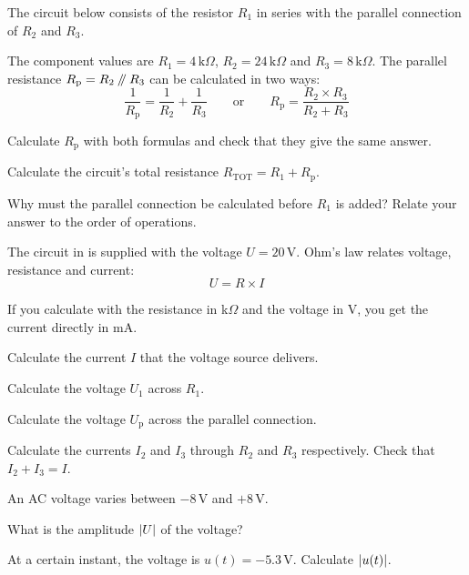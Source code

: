 The circuit below consists of the resistor $R_1$ in series with the parallel connection of $R_2$
and $R_3$.


The component values are $R_1 = 4\,\text{k}\Omega$, $R_2 = 24\,\text{k}\Omega$ and
$R_3 = 8\,\text{k}\Omega$. The parallel resistance $R_{\text{p}} = R_2 \mathbin{/\mkern-5mu/} R_3$ can be
calculated in two ways:
\[
  \frac{1}{R_{\text{p}}} = \frac{1}{R_2} + \frac{1}{R_3}
  \qquad \text{or} \qquad
  R_{\text{p}} = \frac{R_2 \times R_3}{R_2 + R_3}
\]
\begin{parts}
  \item Calculate $R_{\text{p}}$ with both formulas and check that they give the same answer.
  \item Calculate the circuit's total resistance $R_{\text{TOT}} = R_1 + R_{\text{p}}$.
  \item Why must the parallel connection be calculated before $R_1$ is added? Relate your answer
    to the order of operations.
\end{parts}

The circuit in  is supplied with the voltage $U = 20\,\text{V}$. Ohm's law relates
voltage, resistance and current:
\[
  U = R \times I
\]

\begin{aside}
\note[Tip] If you calculate with the resistance in k$\Omega$ and the voltage in V, you get the
current directly in mA.
\end{aside}

\begin{parts}
  \item Calculate the current $I$ that the voltage source delivers.
  \item Calculate the voltage $U_1$ across $R_1$.
  \item Calculate the voltage $U_{\text{p}}$ across the parallel connection.
  \item Calculate the currents $I_2$ and $I_3$ through $R_2$ and $R_3$ respectively. Check that
    $I_2 + I_3 = I$.
\end{parts}

An AC voltage varies between $-8\,\text{V}$ and $+8\,\text{V}$.
\begin{parts}
  \item What is the amplitude $\lvert U\rvert$ of the voltage?
  \item At a certain instant, the voltage is $u(t) = -5.3\,\text{V}$. Calculate $\lvert u(t)\rvert$.
\end{parts}

